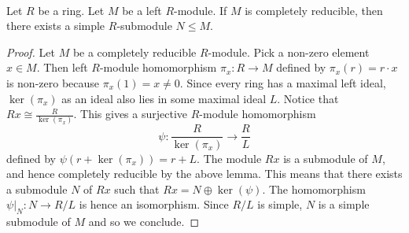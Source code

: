 \documentclass[a4paper]{article}
\begin{document}
\begin{lmm}{}{}\\
Let $R$ be a ring. Let $M$ be a left $R$-module. If $M$ is completely reducible, then there exists a simple $R$-submodule $N\leq M$. 
\begin{proof}
Let $M$ be a completely reducible $R$-module. Pick a non-zero element $x\in M$. Then left $R$-module homomorphism $\pi_x:R\to M$ defined by $\pi_x(r)=r\cdot x$ is non-zero because $\pi_x(1)=x\neq 0$. Since every ring has a maximal left ideal, $\ker(\pi_x)$ as an ideal also lies in some maximal ideal $L$. Notice that $Rx\cong\frac{R}{\ker(\pi_x)}$. This gives a surjective $R$-module homomorphism $$\psi:\frac{R}{\ker(\pi_x)}\to\frac{R}{L}$$ defined by $\psi(r+\ker(\pi_x))=r+L$. The module $Rx$ is a submodule of $M$, and hence completely reducible by the above lemma. This means that there exists a submodule $N$ of $Rx$ such that $Rx=N\oplus\ker(\psi)$. The homomorphism $\psi|_N:N\to R/L$ is hence an isomorphism. Since $R/L$ is simple, $N$ is a simple submodule of $M$ and so we conclude. 
\end{proof}
\end{lmm}
\end{document}
